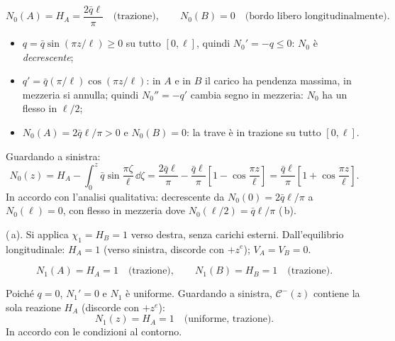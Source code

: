 \begin{esempio}
\begin{svolgimento}
		\[
		N_0(A) = H_A = \frac{2\bar{q}\ell}{\pi}
		\quad\text{(trazione)},
		\qquad
		N_0(B) = 0
		\quad\text{(bordo libero longitudinalmente)}.
		\]
		



		
		
		
		
		
		\begin{itemize}[nosep]
			\item $q = \bar{q}\sin(\pi z/\ell) \geq 0$
			su tutto $[0,\ell]$, quindi
			$N_0' = -q \leq 0$: $N_0$ è
			\emph{decrescente};
			\item $q'= \bar{q}(\pi/\ell)\cos(\pi z/\ell)$:
			in $A$ e in $B$ il carico ha pendenza
			massima, in mezzeria si annulla;
			quindi $N_0'' = -q'$ cambia segno
			in mezzeria: $N_0$ ha un flesso
			in $\ell/2$;
			\item $N_0(A) = 2\bar{q}\ell/\pi > 0$ e
			$N_0(B) = 0$: la trave è in trazione
			su tutto $[0,\ell]$.
		\end{itemize}
		
		Guardando a sinistra:
		\[
		N_0(z) = H_A - \int_0^z \bar{q}
		\sin\frac{\pi\zeta}{\ell}\,\dd\zeta
		= \frac{2\bar{q}\ell}{\pi}
		- \frac{\bar{q}\ell}{\pi}
		\!\left[1 - \cos\frac{\pi z}{\ell}
		\right]
		= \frac{\bar{q}\ell}{\pi}
		\!\left[1 + \cos\frac{\pi z}{\ell}
		\right].
		\]
		In accordo con l'analisi qualitativa:
		decrescente da $N_0(0) = 2\bar{q}\ell/\pi$
		a $N_0(\ell) = 0$, con flesso in mezzeria
		dove $N_0(\ell/2) = \bar{q}\ell/\pi$ (\,b).
		
		
		(\,a).
		Si applica $\chi_1 = H_B = 1$ verso destra,
		senza carichi esterni.
		Dall'equilibrio longitudinale:
		$H_A = 1$ (verso sinistra, discorde con
		$+z^e$); $V_A = V_B = 0$.
		
		\[
		N_1(A) = H_A = 1 \quad\text{(trazione)},
		\qquad
		N_1(B) = H_B = 1 \quad\text{(trazione)}.
		\]
		
		Poiché $q = 0$, $N_1' = 0$ e $N_1$ è
		uniforme. Guardando a sinistra,
		$\mathcal{C}^-(z)$ contiene la sola
		reazione $H_A$ (discorde con $+z^e$):
		\[
		N_1(z) = H_A = 1
		\quad\text{(uniforme, trazione)}.
		\]
		In accordo con le condizioni al contorno.
		

\end{svolgimento}
\end{esempio}
